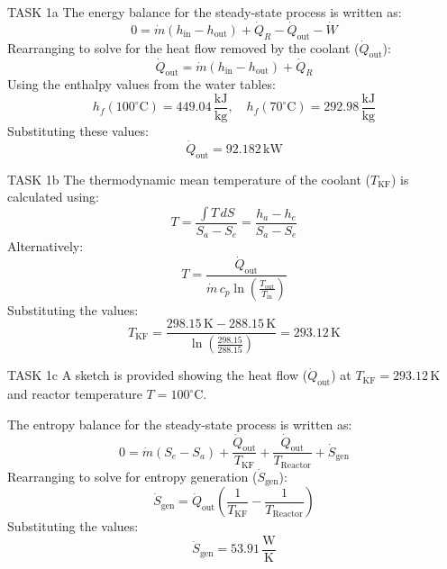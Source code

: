 TASK 1a  
The energy balance for the steady-state process is written as:  
\[
0 = \dot{m} (h_{\text{in}} - h_{\text{out}}) + \dot{Q}_R - \dot{Q}_{\text{out}} - \dot{W}
\]  
Rearranging to solve for the heat flow removed by the coolant (\( \dot{Q}_{\text{out}} \)):  
\[
\dot{Q}_{\text{out}} = \dot{m} (h_{\text{in}} - h_{\text{out}}) + \dot{Q}_R
\]  
Using the enthalpy values from the water tables:  
\[
h_f(100^\circ\text{C}) = 449.04 \, \frac{\text{kJ}}{\text{kg}}, \quad h_f(70^\circ\text{C}) = 292.98 \, \frac{\text{kJ}}{\text{kg}}
\]  
Substituting these values:  
\[
\dot{Q}_{\text{out}} = 92.182 \, \text{kW}
\]  

TASK 1b  
The thermodynamic mean temperature of the coolant (\( T_{\text{KF}} \)) is calculated using:  
\[
T = \frac{\int T \, dS}{S_a - S_e} = \frac{h_a - h_e}{S_a - S_e}
\]  
Alternatively:  
\[
T = \frac{\dot{Q}_{\text{out}}}{\dot{m} \, c_p \ln\left(\frac{T_{\text{out}}}{T_{\text{in}}}\right)}
\]  
Substituting the values:  
\[
T_{\text{KF}} = \frac{298.15 \, \text{K} - 288.15 \, \text{K}}{\ln\left(\frac{298.15}{288.15}\right)} = 293.12 \, \text{K}
\]  

TASK 1c  
A sketch is provided showing the heat flow (\( \dot{Q}_{\text{out}} \)) at \( T_{\text{KF}} = 293.12 \, \text{K} \) and reactor temperature \( T = 100^\circ\text{C} \).  

The entropy balance for the steady-state process is written as:  
\[
0 = \dot{m} (S_e - S_a) + \frac{\dot{Q}_{\text{out}}}{T_{\text{KF}}} + \frac{\dot{Q}_{\text{out}}}{T_{\text{Reactor}}} + \dot{S}_{\text{gen}}
\]  
Rearranging to solve for entropy generation (\( \dot{S}_{\text{gen}} \)):  
\[
\dot{S}_{\text{gen}} = \dot{Q}_{\text{out}} \left( \frac{1}{T_{\text{KF}}} - \frac{1}{T_{\text{Reactor}}} \right)
\]  
Substituting the values:  
\[
\dot{S}_{\text{gen}} = 53.91 \, \frac{\text{W}}{\text{K}}
\]